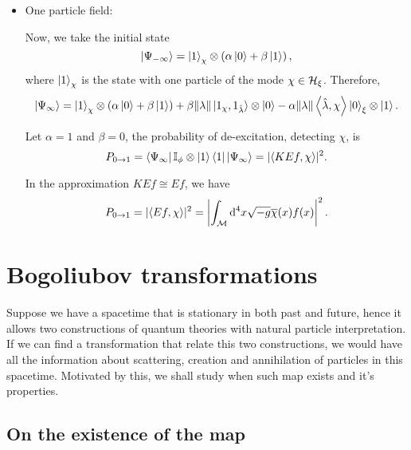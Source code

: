 \begin{itemize}
    \item One particle field:
    
    Now, we take the initial state
    \begin{equation}
        \ket{\Psi_{-\infty}}=\ket{1}_{\chi}\otimes\left(\alpha\ket{0}+\beta\ket{1}\right),
    \end{equation}
    where \(\ket{1}_\chi\) is the state with one particle of the mode \(\chi\in{\mathcal{H}}_\xi\). Therefore,
    \begin{equation}
        \ket{\Psi_\infty}=\ket{1}_\chi\otimes\left(\alpha\ket{0}+\beta\ket{1}\right)+\beta\lVert\lambda\rVert\ket{1_\chi,1_{\hat{\lambda}}}\otimes\ket{0}-\alpha\lVert\lambda\rVert\left\langle \hat{\lambda}, \chi\right\rangle\ket{0}_\xi\otimes\ket{1}.
    \end{equation}

    Let \(\alpha=1\) and \(\beta=0\), the probability of de-excitation, detecting \(\chi\), is
    \begin{equation}
        P_{0\to1}=\bra{\Psi_{\infty}}{\mathbb{I}}_{\phi}\otimes\ket{1}\bra{1}\ket{\Psi_\infty}=\lvert\left\langle KEf, \chi\right\rangle\rvert^2.
    \end{equation}

    In the approximation \(KEf\cong Ef\), we have
    \begin{equation}
        P_{0\to1}=\lvert\left\langle Ef, \chi\right\rangle\rvert^2=\left\lvert\int_{{\mathcal{M}}}\mathrm{d}^4x\sqrt{-g}\overline{\chi}(x)f(x)\right\rvert^2.
    \end{equation}
\end{itemize}

\section{Bogoliubov transformations}
Suppose we have a spacetime that is stationary in both past and future, hence it allows two constructions of quantum theories with natural particle interpretation. If we can find a transformation that relate this two constructions, we would have all the information about scattering, creation and annihilation of particles in this spacetime. Motivated by this, we shall study when such map exists and it's properties.
\subsection*{On the existence of the map}

